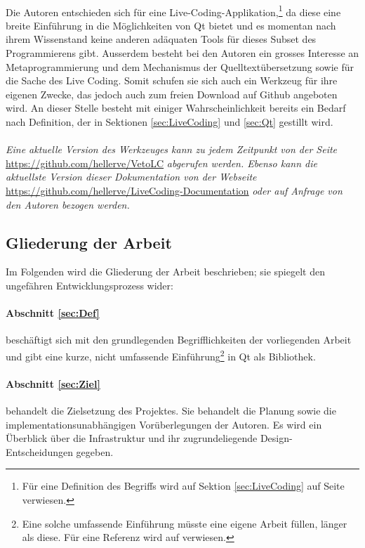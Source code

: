 \paragraph{}
	Die Autoren entschieden sich für eine Live-Coding-Applikation,\footnote{Für eine Definition des Begriffs wird auf Sektion \ref{sec:LiveCoding}
	auf Seite \pageref{sec:LiveCoding} verwiesen.} da diese eine breite Einführung in die Möglichkeiten von Qt bietet und es momentan
	nach ihrem Wissenstand keine anderen adäquaten Tools für dieses Subset des Programmierens gibt. Ausserdem besteht bei den Autoren
	ein grosses Interesse an Metaprogrammierung und dem Mechanismus der Quelltextübersetzung sowie für die Sache des Live Coding.
	Somit schufen sie sich auch ein Werkzeug für ihre eigenen Zwecke, das jedoch auch zum freien Download auf Github
	angeboten wird. An dieser Stelle besteht mit einiger Wahrscheinlichkeit bereits ein Bedarf nach Definition, der in Sektionen 
    \ref{sec:LiveCoding} und \ref{sec:Qt} gestillt wird.
\paragraph{}
    \textit{Eine aktuelle Version des Werkzeuges kann zu jedem Zeitpunkt von der Seite }\url{https://github.com/hellerve/VetoLC}\textit{ abgerufen werden.
    Ebenso kann die aktuellste Version dieser Dokumentation von der Webseite}\linebreak
    \url{https://github.com/hellerve/LiveCoding-Documentation}\textit{ oder auf Anfrage von den Autoren bezogen werden.}

\newpage

\subsection{Gliederung der Arbeit}
	Im Folgenden wird die Gliederung der Arbeit beschrieben; sie spiegelt den ungefähren Entwicklungsprozess wider:
\paragraph{Abschnitt \ref{sec:Def}}
	beschäftigt sich mit den grundlegenden Begrifflichkeiten der vorliegenden Arbeit und gibt eine kurze, nicht umfassende Einführung\footnote{Eine solche 
    umfassende Einführung müsste eine eigene Arbeit füllen, länger als diese. Für eine Referenz wird auf \cite{EE11} verwiesen.} in Qt als Bibliothek.
\paragraph{Abschnitt \ref{sec:Ziel}}
	behandelt die Zielsetzung des Projektes. Sie behandelt die Planung sowie die implementationsunabhängigen Vorüberlegungen der Autoren.
	Es wird ein Überblick über die Infrastruktur und ihr zugrundeliegende Design-Entscheidungen gegeben.
